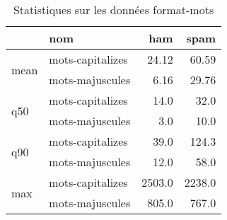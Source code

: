 \begin{table}[H]
\centering
\caption{Statistiques sur les données format-mots}
\label{tab:f_format-mots}
\begin{tabular}{ll|rr}
\toprule
 & nom & ham & spam \\
\midrule
\multirow[c]{2}{*}{mean} & mots-capitalizes & 24.12 & 60.59 \\
 & mots-majuscules & 6.16 & 29.76 \\
\cline{1-4}
\multirow[c]{2}{*}{q50} & mots-capitalizes & 14.0 & 32.0 \\
 & mots-majuscules & 3.0 & 10.0 \\
\cline{1-4}
\multirow[c]{2}{*}{q90} & mots-capitalizes & 39.0 & 124.3 \\
 & mots-majuscules & 12.0 & 58.0 \\
\cline{1-4}
\multirow[c]{2}{*}{max} & mots-capitalizes & 2503.0 & 2238.0 \\
 & mots-majuscules & 805.0 & 767.0 \\
\cline{1-4}
\bottomrule
\end{tabular}
\end{table}
